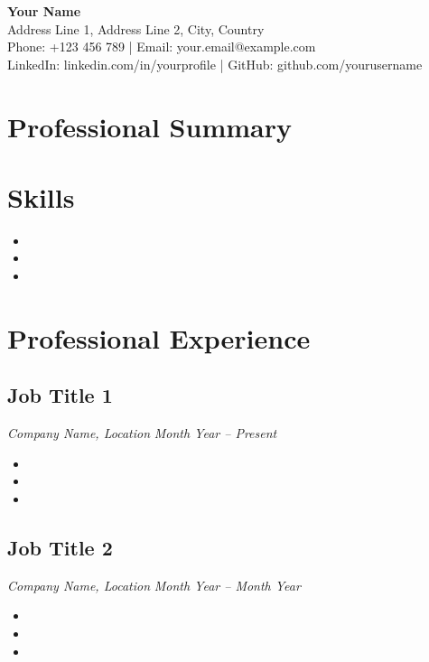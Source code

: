 \documentclass[a4paper,10pt]{article}
\begin{document}
\begin{center}
    \textbf{\huge Your Name} \\
    \vspace{0.5cm}
    \small
    Address Line 1, Address Line 2, City, Country \\
    Phone: +123 456 789 | Email: your.email@example.com \\
    LinkedIn: linkedin.com/in/yourprofile | GitHub: github.com/yourusername \\
\end{center}

\vspace{0.5cm}

\section*{Professional Summary}
\lipsum[1]

\section*{Skills}
\begin{itemize}[noitemsep]
    \item \lipsum[2][1-3]
    \item \lipsum[2][4-6]
    \item \lipsum[2][7-9]
\end{itemize}

\section*{Professional Experience}
\subsection*{Job Title 1}
\textit{Company Name, Location} \hfill \textit{Month Year -- Present}
\begin{itemize}[noitemsep]
    \item \lipsum[3][1-3]
    \item \lipsum[3][4-6]
    \item \lipsum[3][7-9]
\end{itemize}

\subsection*{Job Title 2}
\textit{Company Name, Location} \hfill \textit{Month Year -- Month Year}
\begin{itemize}[noitemsep]
    \item \lipsum[4][1-3]
    \item \lipsum[4][4-6]
    \item \lipsum[4][7-9]
\end{itemize}
\end{document}
